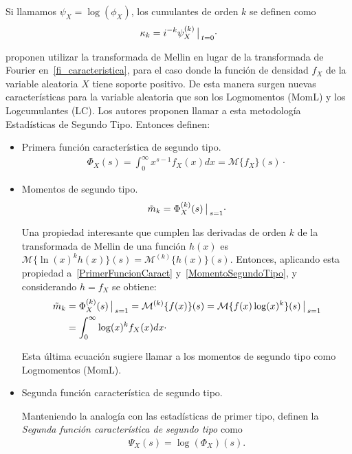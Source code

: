Si llamamos $\psi_X=\log(\phi_X)$, los cumulantes de orden $k$ se definen como 
\begin{align}
\label{CumulantePrimerTipo}
\kappa_k=i^{-k} \psi_X^{(k)}\big\arrowvert _{t=0}\cdot
\end{align}

 \citet{nicolas2002} proponen utilizar la transformada de Mellin en lugar de la transformada de Fourier en~\eqref{fi_caracteristica}, para el caso donde la función de densidad $f_X$ de la variable aleatoria $X$ tiene soporte positivo. De esta manera surgen nuevas características para la variable aleatoria que son los Logmomentos (MomL) y los  Logcumulantes (LC). Los autores proponen llamar a esta metodología Estadísticas de Segundo Tipo. Entonces definen:
\begin{itemize}
\item Primera función característica de segundo tipo.
	\begin{align}
	\Phi_X(s)=\int_{0}^{\infty} x^{s-1} f_X(x) dx = \mathcal{M}\{f_X\}(s)\cdot
	\label{PrimerFuncionCaract}
	\end{align}
\item Momentos de segundo tipo.
	\begin{align}
	\label{MomentoSegundoTipo}
	\tilde{m}_k=\Phi_X^{(k)}(s) \big\arrowvert _{s=1}\cdot
	\end{align}


Una propiedad interesante que cumplen las derivadas de orden $k$ de la transformada de Mellin de una función $h(x)$ es $\mathcal{M}\{\ln(x)^k h(x)\}(s)=\mathcal{M}^{(k)}\{h(x)\}(s)$. Entonces, aplicando esta propiedad a~\eqref{PrimerFuncionCaract} y~\eqref{MomentoSegundoTipo}, y considerando $h=f_X$ se obtiene:
	\begin{align}
	\label{MomL}
	\nonumber \tilde{m}_k&=\Phi_X^{(k)}(s) \big\arrowvert _{s=1} =\mathcal{M}^{(k)}\{f(x)\}(s) =\mathcal{M}\{f(x) \log(x)^k\}(s)\big\arrowvert _{s=1}          \\
 	        &=\int_{0}^{\infty} \log(x)^k f_X(x) dx \cdot
	\end{align}

	Esta última ecuación sugiere llamar a los momentos de segundo tipo como Logmomentos (MomL).
	
\item Segunda función característica de segundo tipo.

      Manteniendo la analogía con las estadísticas de primer tipo, \citet{nicolas2002} definen la \textit{Segunda función característica de segundo tipo} como
      \begin{align}
      \label{Sgunda Psi}
      \Psi_X(s)=\log(\Phi_X)(s).
      \end{align}
      

\end{itemize}
